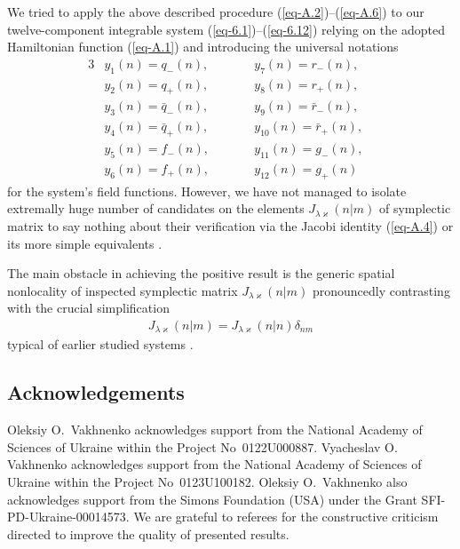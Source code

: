 \documentclass[10pt,a4paper]{amsart}
\numberwithin{equation}{section}
\begin{document}
We tried to apply the above described procedure (\ref{eq-A.2})--(\ref{eq-A.6}) to our twelve-component integrable system (\ref{eq-6.1})--(\ref{eq-6.12}) relying on the adopted Hamiltonian function (\ref{eq-A.1}) and introducing the universal notations
\begin{alignat*}{3}%
	&y_{1}(n) = q_{-}(n),\qquad&& y_{7}(n) = r_{-}(n),&
\\ %
	&y_{2}(n) = q_{+}(n),\qquad&& y_{8}(n) = r_{+}(n),&
\\ %
	&y_{3}(n) = \bar{q}_{-}(n),\qquad&& y_{9}(n) = \bar{r}_{-}(n),&
\\ %
	&y_{4}(n) = \bar{q}_{+}(n),\qquad&& y_{10}(n) = \bar{r}_{+}(n),&
\\ %
	&y_{5}(n) = f_{-}(n),\qquad&& y_{11}(n) = g_{-}(n),&
\\ %
	&y_{6}(n) = f_{+}(n),\qquad&& y_{12}(n) = g_{+}(n)&
\end{alignat*}
for the system's field functions. However, we have not managed to isolate extremally huge number of candidates on the elements $J_{\lambda\varkappa}(n|m)$ of symplectic matrix to say nothing about their verification via the Jacobi identity (\ref{eq-A.4}) or its more simple equivalents \cite {maschke-JFI-329-923, torres-del-castillo-RMF-50-608, vakhnenko-JMP-59-053504, vakhnenko-LMP-108-1807}.

The main obstacle in achieving the positive result is the generic spatial nonlocality
of inspected symplectic matrix $J_{\lambda\varkappa}(n|m)$ pronouncedly contrasting with the crucial simplification
 \begin{gather}\label{eq-A.13}
 	J_{\lambda\varkappa}(n|m) = J_{\lambda\varkappa}(n|n)\delta_{nm}
\end{gather}
typical of earlier studied systems \cite{vakhnenko-JMP-56-033505, vakhnenko-JMP-57-113504, vakhnenko-JNMP-24-250, vakhnenko-JMP-59-053504, vakhnenko-LMP-108-1807}.

\subsection*{Acknowledgements}

Oleksiy O.~Vakhnenko acknowledges support from the National Academy of Sciences of Ukraine within the Project No~0122U000887.
Vyacheslav O. Vakhnenko acknowledges support from the National Academy of Sciences of Ukraine within the Project No~0123U100182.
Oleksiy O.~Vakhnenko also acknowledges support from the Simons Foundation (USA) under the Grant SFI-PD-Ukraine-00014573.
We are grateful to referees for the constructive criticism directed to improve the quality of presented results.
\end{document}
